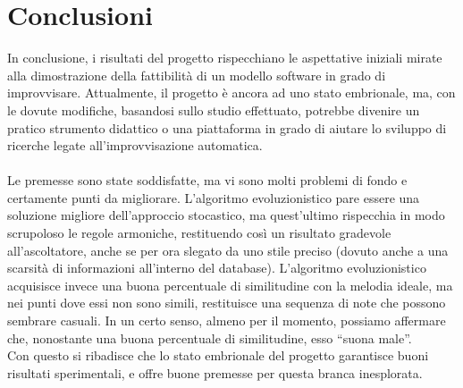 \section{Conclusioni}
In conclusione, i risultati del progetto rispecchiano le aspettative iniziali
mirate alla dimostrazione della fattibilità di un modello software in grado di improvvisare.
Attualmente, il progetto è ancora ad uno stato embrionale, ma, con le dovute
modifiche, basandosi sullo studio effettuato, potrebbe divenire un pratico
strumento didattico o una piattaforma in grado di aiutare lo sviluppo di
ricerche legate all'improvvisazione automatica.\\
\\
Le premesse sono state soddisfatte, ma vi sono molti problemi di fondo e certamente punti da migliorare.
L'algoritmo evoluzionistico pare essere una soluzione migliore dell'approccio stocastico, ma quest'ultimo rispecchia in modo scrupoloso le regole armoniche, restituendo così un risultato gradevole all'ascoltatore, anche se per ora slegato da uno stile preciso (dovuto anche a una scarsità di informazioni all'interno del database).
L'algoritmo evoluzionistico acquisisce invece una buona percentuale di similitudine con la melodia ideale, ma nei punti dove essi non sono simili, restituisce una sequenza di note che possono sembrare casuali.
In un certo senso, almeno per il momento, possiamo affermare che, nonostante una buona percentuale di similitudine, esso ``suona male''.\\
Con questo si ribadisce che lo stato embrionale del progetto garantisce buoni risultati sperimentali, e offre buone premesse per questa branca inesplorata.


